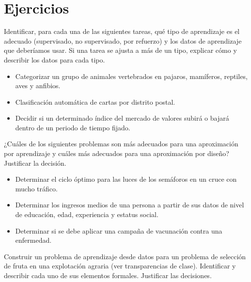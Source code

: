 \documentclass[a4paper, 11pt]{article}
\begin{document}
    \maketitle

    \section{Ejercicios}

    \begin{ejercicio}
        Identificar, para cada una de las siguientes tareas, qué tipo de aprendizaje es el adecuado (supervisado, no supervisado, por refuerzo) y los datos de aprendizaje que deberíamos usar. Si una tarea se ajusta a más de un tipo, explicar cómo y describir los datos para cada tipo.
        \begin{itemize}
            \item Categorizar un grupo de animales vertebrados en pajaros, mamíferos, reptiles, aves y anfibios.
            \item Clasificación automática de cartas por distrito postal.
            \item Decidir si un determinado índice del mercado de valores subirá o bajará dentro de un periodo de tiempo fijado.
        \end{itemize}
    \end{ejercicio}


    \begin{ejercicio}
        ¿Cuáles de los siguientes problemas son más adecuados para una aproximación por aprendizaje y cuáles más adecuados para una aproximación por diseño? Justificar la decisión.
        \begin{itemize}
            \item Determinar el ciclo óptimo para las luces de los semáforos en un cruce con mucho tráfico.
            \item Determinar los ingresos medios de una persona a partir de sus datos de nivel de educación, edad, experiencia y estatus social.
            \item Determinar si se debe aplicar una campaña de vacunación contra una enfermedad.
        \end{itemize}
    \end{ejercicio}

    \begin{ejercicio}
        Construir un problema de aprendizaje desde datos para un problema de selección de fruta en una explotación agraria (ver transparencias de clase). Identificar y describir cada uno de sus elementos formales. Justificar las decisiones.
    \end{ejercicio}
\end{document}
